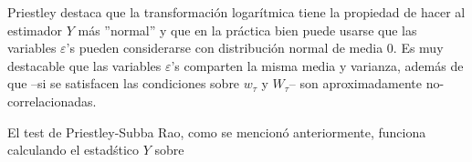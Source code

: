 %
%
%

Priestley \cite{Priestley81} destaca que la transformaci\'on logar\'itmica tiene la propiedad
de hacer al estimador $Y$ m\'as ''normal'' y que en la pr\'actica bien puede usarse que las
variables $\varepsilon$'s pueden considerarse con distribuci\'on normal de media 0.
Es muy destacable que las variables $\varepsilon$'s comparten la misma media y varianza, 
adem\'as de que --si se satisfacen las condiciones sobre $w_\tau$ y $W_\tau$-- son
aproximadamente no-correlacionadas.


El test de Priestley-Subba Rao, como se mencion\'o anteriormente, funciona calculando el
estad\'stico $Y$ sobre 




